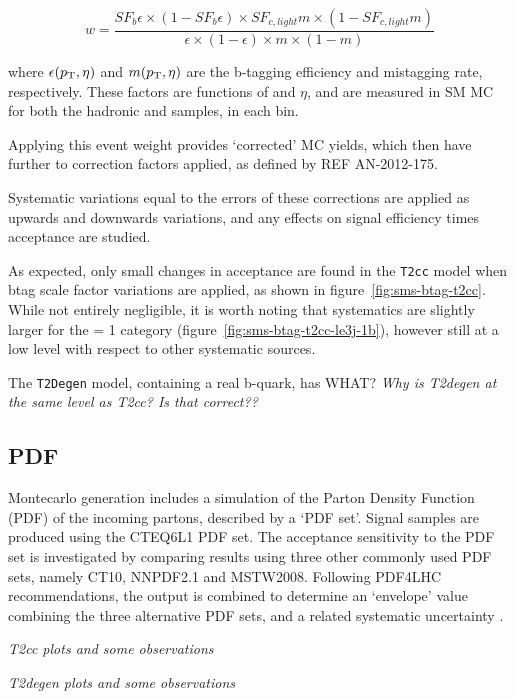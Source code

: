 \begin{equation}
w = \frac{SF_b \epsilon \times (1-SF_b \epsilon) \times SF_{c,light} m \times (1
-SF_{c,light} m)}{\epsilon \times (1-\epsilon) \times m \times (1-m)}
\label{eq:btag_fullsim_weight}
\end{equation}

where $\epsilon({p_{\text T}}, \eta)$ and $m({p_{\text T}}, \eta)$ are the b-tagging efficiency and 
mistagging rate, respectively. These factors are functions of \Pt and $\eta$, and
are measured in SM MC for both the hadronic and \mj samples, in each \HT bin.

Applying this event weight provides `corrected' MC yields, which then 
have further \FASTSIM to \FULLSIM correction factors applied, as defined by REF 
AN-2012-175.

Systematic variations equal to the errors of these corrections are applied as 
upwards and downwards variations, and any effects on signal efficiency times 
acceptance are studied.

As expected, only small changes in acceptance are found in the \texttt{T2cc} 
model when btag scale factor variations are applied, as shown in
figure~\ref{fig:sms-btag-t2cc}. While not entirely negligible, it is worth 
noting that systematics are slightly larger for the \nb= 1 category
(figure~\ref{fig:sms-btag-t2cc-le3j-1b}), however still at a low level with 
respect to other systematic sources.

The \texttt{T2Degen} model, containing a real b-quark, has WHAT?
\emph{Why is T2degen at the same level as T2cc? Is that correct??}


\subsection{PDF}
Montecarlo generation includes a simulation of the Parton Density Function (PDF) 
of the incoming partons, described by a `PDF set'. Signal samples are produced
using the \textsc{CTEQ6L1} PDF set. The acceptance 
sensitivity to the PDF set is investigated by comparing results using three
other commonly used PDF sets, namely \textsc{CT10}, \textsc{NNPDF2.1} and
\textsc{MSTW2008}. Following PDF4LHC recommendations, the output is 
combined to determine an `envelope' value combining the three alternative PDF 
sets, and a related systematic uncertainty  \cite{pdf4lhc}.

\emph{T2cc plots and some observations}

\emph{T2degen plots and some observations}

